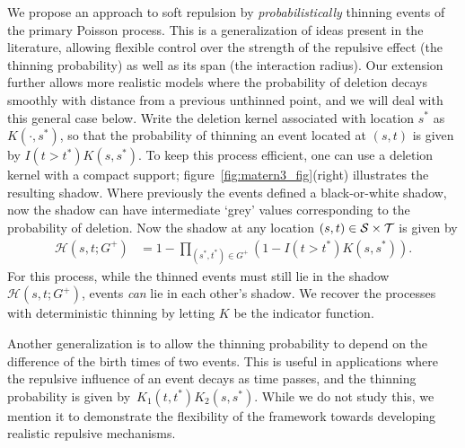 \documentclass{statsoc}
\begin{document}
We propose an approach to soft repulsion by \emph{probabilistically} thinning events of the primary Poisson process. %
This is a generalization of ideas present in the literature, allowing flexible control over the strength of the repulsive effect (the thinning
probability) as well as its span (the interaction radius). Our extension further allows more realistic models where the probability of 
deletion decays smoothly with distance from a previous unthinned point, and we will deal with this general case below.
Write the deletion kernel associated
with location $s^*$ as $K(\cdot, s^*)$, so that the probability of thinning an event located at $(s,t)$ is given by $I(t > t^*)K(s, s^*)$. 
To keep this process efficient, 
one can use a deletion kernel with a compact support; figure~\ref{fig:matern3_fig}(right) illustrates the resulting shadow.
Where previously the \matern events defined a black-or-white shadow, now the shadow can have intermediate `grey' values corresponding
to the probability of deletion. Now the shadow at any location $(s,t) \in {\mathcal S} \times {\mathcal T}$ is given by
\begin{align}
  \mathscr{H}(s,t;G^+) &= 1 - \!\!\!\!\!\!\! \prod_{(s^*,t^*) \in G^+} \!\!\!\!\!\! \left(1 - I(t > t^*) K(s, s^*) \right). \label{eq:thin_shad}
\end{align}
For this process, while the thinned events must still lie in the shadow $\mathscr{H}(s,t;G^+)$, \matern events \emph{can} lie in each other's shadow.
We recover the \matern processes with deterministic thinning by letting $K$ be the indicator function.

Another generalization is to allow the thinning probability to depend on the difference of the birth times of two events. This is useful in
applications where the repulsive influence of an event decays as time passes, and the thinning probability is given by~$K_1(t, t^*)K_2(s, s^*)$.
While we do not study this, we mention it to demonstrate the flexibility of the \matern framework towards developing realistic 
repulsive mechanisms.
\end{document}
